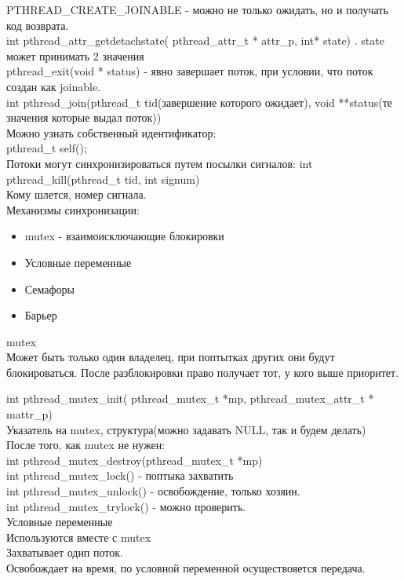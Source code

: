   PTHREAD_CREATE_JOINABLE - можно не только ожидать, но и получать код возврата.\\
int pthread_attr_getdetachstate( pthread_attr_t * attr_p, int* state) . state может принимать 2 значения\\
pthread_exit(void * status) - явно завершает поток, при условии, что поток создан как joinable. \\
int pthread_join(pthread_t tid(завершение которого ожидает), void **status(те значения которые выдал поток)) \\
Можно узнать собственный идентификатор: \\
pthread_t self(); \\

Потоки могут синхронизироваться путем посылки сигналов:
int pthread_kill(pthread_t tid, int signum) \\
Кому шлется, номер сигнала.\\

Механизмы синхронизации:\\
\begin{itemize}
  \item mutex - взаимоисключающие блокировки
  \item Условные переменные
  \item Семафоры
  \item Барьер
\end{itemize}

mutex\\
Может быть только один владелец, при поптытках других они будут блокироваться.
После разблокировки право получает тот, у кого выше приоритет.

int pthread_mutex_init( pthread_mutex_t *mp, pthread_mutex_attr_t * mattr_p)\\
Указатель на mutex, структура(можно задавать NULL, так и будем делать)\\
После того, как mutex не нужен:\\
int pthread_mutex_destroy(pthread_mutex_t *mp)\\
int pthread_mutex_lock() - поптыка захватить \\
int pthread_mutex_unlock() - освобождение, только хозяин. \\
int pthread_mutex_trylock() - можно проверить. \\


Условные переменные\\
Используются вместе с mutex\\
Захватывает одип поток. \\
Освобождает на время, по условной переменной осуществояется передача.\\

